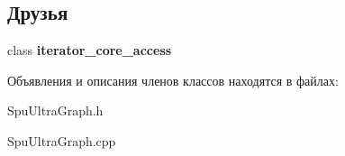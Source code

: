 \subsection*{Друзья}
\begin{DoxyCompactItemize}
\item 
\mbox{\label{class_s_p_u___g_r_a_p_h_1_1_spu_ultra_graph_1_1_vertex_iterator_a0975271623c74c5b89bdf8d7fbce69c4}} 
class {\bfseries iterator\+\_\+core\+\_\+access}
\end{DoxyCompactItemize}


Объявления и описания членов классов находятся в файлах\+:\begin{DoxyCompactItemize}
\item 
Spu\+Ultra\+Graph.\+h\item 
Spu\+Ultra\+Graph.\+cpp\end{DoxyCompactItemize}
